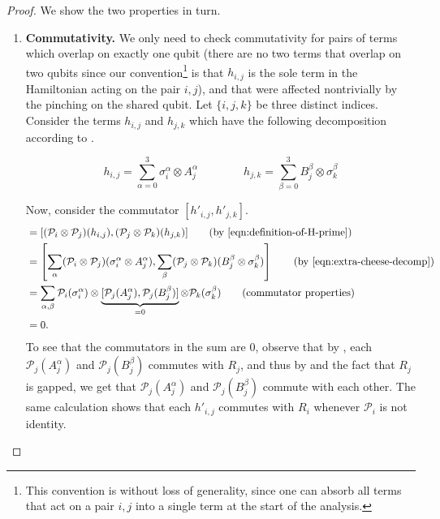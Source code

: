 \documentclass[a4paper,onecolumn,11pt]{quantumarticle}
\theoremstyle{plain}
\renewcommand{\cP}{\mathcal{P}}
\begin{document}
\begin{proof}

We show the two properties in turn.
\begin{enumerate}
    \item \textbf{Commutativity.} We only need to check commutativity for pairs of terms which overlap on exactly one qubit (there are no two terms that overlap on two qubits since our convention\footnote{This convention is without loss of generality, since one can absorb all terms that act on a pair $i,j$ into a single term at the start of the analysis.} is that $h_{i,j}$ is the sole term in the Hamiltonian acting on the pair $i,j$), and that were affected nontrivially by the pinching on the shared qubit. Let $\{i, j, k\}$ be three distinct indices. Consider the terms $h_{i,j}$ and $h_{j,k}$ which have the following decomposition according to .

    \begin{equation}\label{eqn:extra-cheese-decomp}
        h_{i,j} = \sum\limits_{\alpha = 0}^3 \sigma^\alpha_i \otimes A_j^\alpha \quad\quad\quad\quad h_{j,k} = \sum\limits_{\beta = 0}^3 B_j^\beta \otimes \sigma^\beta_k
    \end{equation}
    
Now, consider the commutator $[h'_{i,j}, h'_{j,k}]$.
\begin{align*}
    [h'_{i,j}, h'_{j,k}] &= [ (\cP_i \otimes \cP_j)(h_{i,j}), (\cP_j \otimes \cP_k)(h_{j,k}) ]  \qquad \text{(by \Cref{eqn:definition-of-H-prime})}\\
    &= \left[ \sum_{\alpha} (\cP_i \otimes \cP_j)(\sigma^\alpha_i \otimes A_j^\alpha), \sum_{\beta} (\cP_j \otimes \cP_k)(B_j^\beta \otimes \sigma^\beta_k) \right ]  \qquad \text{(by \Cref{eqn:extra-cheese-decomp})}\\
    &= \sum_{\alpha,\beta} \cP_i(\sigma_i^\alpha) \otimes \underbrace{[\cP_j(A^\alpha_j), \cP_j(B^\beta_j)]}_{=0} \otimes \cP_k(\sigma_k^\beta) \qquad \text{(commutator properties)}\\
    &= 0.
\end{align*}
To see that the commutators in the sum are $0$, observe that by , each $\cP_j(A_j^\alpha)$ and $\cP_j(B_j^\beta)$ commutes with $R_j$, and thus by  and the fact that $R_j$ is gapped, we get that $\cP_j(A_j^\alpha)$ and $\cP_j(B_j^\beta)$ commute with each other. The same calculation shows that each $h'_{i,j}$ commutes with $R_i$ whenever $\mathcal{P}_i$ is not identity. 


\end{enumerate}
\end{proof}
\end{document}
